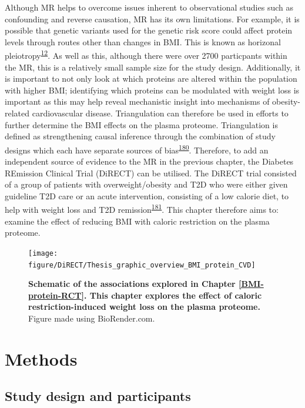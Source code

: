\documentclass[11pt,twoside]{bristolthesis}
\begin{document}
Although MR helps to overcome issues inherent to observational studies such as confounding and reverse causation, MR has its own limitations. For example, it is possible that genetic variants used for the genetic risk score could affect protein levels through routes other than changes in BMI. This is known as horizonal pleiotropy\textsuperscript{\protect\hyperlink{ref-Davies2018}{12}}. As well as this, although there were over 2700 particpants within the MR, this is a relatively small sample size for the study design. Additionally, it is important to not only look at which proteins are altered within the population with higher BMI; identifying which proteins can be modulated with weight loss is important as this may help reveal mechanistic insight into mechanisms of obesity-related cardiovascular disease. Triangulation can therefore be used in efforts to further determine the BMI effects on the plasma proteome. Triangulation is defined as strengthening causal inference through the combination of study designs which each have separate sources of bias\textsuperscript{\protect\hyperlink{ref-Lawlor2016}{180}}. Therefore, to add an independent source of evidence to the MR in the previous chapter, the Diabetes REmission Clinical Trial (DiRECT) can be utilised. The DiRECT trial consisted of a group of patients with overweight/obesity and T2D who were either given guideline T2D care or an acute intervention, consisting of a low calorie diet, to help with weight loss and T2D remission\textsuperscript{\protect\hyperlink{ref-Lean2018}{181}}. This chapter therefore aims to: examine the effect of reducing BMI with caloric restriction on the plasma proteome.



\begin{figure}
\texttt{[image: figure/DiRECT/Thesis\_graphic\_overview\_BMI\_protein\_CVD]} \caption[Schematic of the associations explored in Chapter \ref{BMI-protein-RCT}]{\textbf{Schematic of the associations explored in Chapter \ref{BMI-protein-RCT}. This chapter explores the effect of caloric restriction-induced weight loss on the plasma proteome.} Figure made using BioRender.com.}\label{fig:BMI-protein-graphic2}
\end{figure}
\hypertarget{methods-3}{%
\section{Methods}\label{methods-3}}

\hypertarget{study-design-and-participants}{%
\subsection{Study design and participants}\label{study-design-and-participants}}
\end{document}
